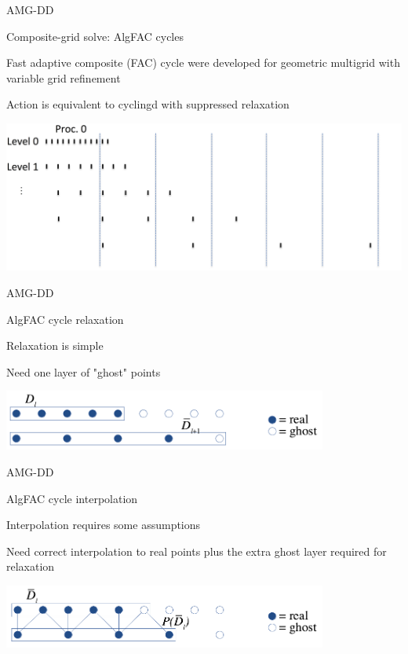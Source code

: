\documentclass[18pt,xcolor=table]{beamer}
\begin{document}
\begin{frame}{AMG-DD}
\begin{block}{Composite-grid solve: AlgFAC cycles}
\bit
\item Fast adaptive composite (FAC) cycle were developed for geometric multigrid with variable grid refinement
\item Action is equivalent to cyclingd with suppressed relaxation
\eit
\end{block}
\centering
\includegraphics[width=\textwidth]{../figures/compGridCreation1D13}
\end{frame}

\begin{frame}{AMG-DD}
\begin{block}{AlgFAC cycle relaxation}
\bit
\item Relaxation is simple
\item Need one layer of "ghost" points
\eit
\end{block}
\centering
\includegraphics[width=0.8\textwidth]{../figures/D}
\end{frame}

\begin{frame}{AMG-DD}
\begin{block}{AlgFAC cycle interpolation}
\bit
\item Interpolation requires some assumptions
\item Need correct interpolation to real points plus the extra ghost layer required for relaxation
\eit
\end{block}
\centering
\includegraphics[width=0.8\textwidth]{../figures/PD}
\end{frame}
\end{document}

